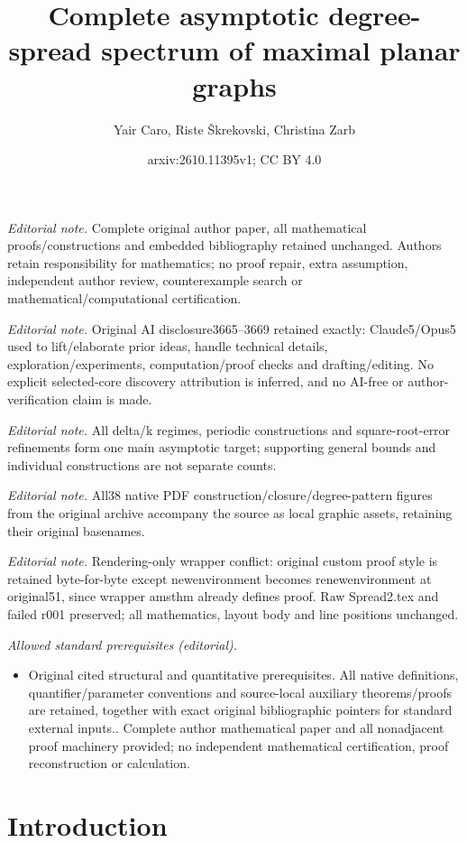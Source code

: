\documentclass[10pt,a4paper]{article}
\title{Complete asymptotic degree-spread spectrum of maximal planar graphs}
\author{Yair Caro, Riste Škrekovski, Christina Zarb}
\date{arxiv:2610.11395v1; CC BY 4.0}
\begin{document}
\maketitle
\noindent\textit{Editorial note.} Complete original author paper, all mathematical proofs/constructions and embedded bibliography retained unchanged. Authors retain responsibility for mathematics; no proof repair, extra assumption, independent author review, counterexample search or mathematical/computational certification.\par\medskip
\noindent\textit{Editorial note.} Original AI disclosure3665--3669 retained exactly: Claude5/Opus5 used to lift/elaborate prior ideas, handle technical details, exploration/experiments, computation/proof checks and drafting/editing. No explicit selected-core discovery attribution is inferred, and no AI-free or author-verification claim is made.\par\medskip
\noindent\textit{Editorial note.} All delta/k regimes, periodic constructions and square-root-error refinements form one main asymptotic target; supporting general bounds and individual constructions are not separate counts.\par\medskip
\noindent\textit{Editorial note.} All38 native PDF construction/closure/degree-pattern figures from the original archive accompany the source as local graphic assets, retaining their original basenames.\par\medskip
\noindent\textit{Editorial note.} Rendering-only wrapper conflict: original custom proof style is retained byte-for-byte except newenvironment becomes renewenvironment at original51, since wrapper amsthm already defines proof. Raw Spread2.tex and failed r001 preserved; all mathematics, layout body and line positions unchanged.\par\medskip
\noindent\textit{Allowed standard prerequisites (editorial).}\begin{itemize}
\item Original cited structural and quantitative prerequisites. All native definitions, quantifier/parameter conventions and source-local auxiliary theorems/proofs are retained, together with exact original bibliographic pointers for standard external inputs.. Complete author mathematical paper and all nonadjacent proof machinery provided; no independent mathematical certification, proof reconstruction or calculation.
\end{itemize}\medskip
\section{Introduction}
\end{document}
